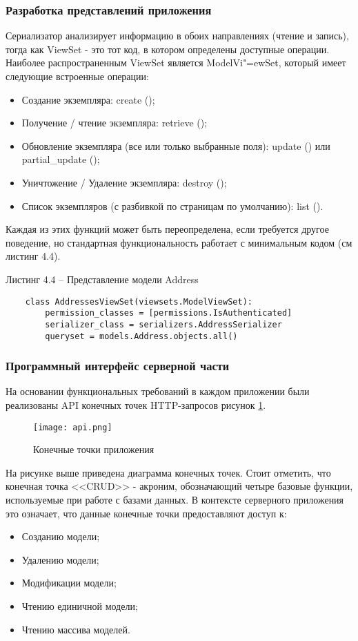\subsubsection{Разработка представлений приложения}\hfill

Сериализатор анализирует информацию в обоих направлениях (чтение и запись), тогда как ViewSet - это тот код, в котором определены доступные операции.
Наиболее распространенным ViewSet является ModelVi"=ewSet, который имеет следующие встроенные операции:
\begin{itemize}
    \item Создание экземпляра: create ();
    \item Получение / чтение экземпляра: retrieve ();
    \item Обновление экземпляра (все или только выбранные поля): update () или partial\_update ();
    \item Уничтожение / Удаление экземпляра: destroy ();
    \item Список экземпляров (с разбивкой по страницам по умолчанию): list ().
\end{itemize}

Каждая из этих функций может быть переопределена, если требуется другое поведение, но стандартная функциональность работает с минимальным кодом (см листинг 4.4).

Листинг 4.4 – Представление модели Address
\begin{lstlisting}
    class AddressesViewSet(viewsets.ModelViewSet):
        permission_classes = [permissions.IsAuthenticated]
        serializer_class = serializers.AddressSerializer
        queryset = models.Address.objects.all()
\end{lstlisting}

\subsubsection{Программный интерфейс серверной части}\hfill

На основании функциональных требований в каждом приложении были реализованы API конечных точек HTTP-запросов рисунок \ref{back:api}.

\begin{figure}
    \texttt{[image: api.png]}
    \caption{Конечные точки приложения}
    \label{back:api}
\end{figure}

На рисунке выше приведена диаграмма конечных точек.
Стоит отметить, что конечная точка <<CRUD>> -  акроним, обозначающий четыре базовые функции, используемые при работе с базами данных.
В контексте серверного приложения это означает, что данные конечные точки предоставляют доступ к:
\begin{itemize}
    \item Созданию модели;
    \item Удалению модели;
    \item Модификации модели;
    \item Чтению единичной модели;
    \item Чтению массива моделей.
\end{itemize}

